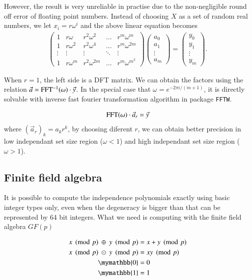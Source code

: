 \documentclass{article}
\newcommand{\<}{\langle}
\renewcommand{\>}{\rangle}
\theoremstyle{definition}\newtheorem{definition}{\textit{Definition}}
\begin{document}
However, the result is very unreliable in practise due to the non-negligible round off error of floating point numbers.
Instead of choosing $X$ as a set of random real numbers, we let $x_i = r\omega^i$ and the above linear equation becomes
\begin{align}
\left(\begin{matrix}
1 & r\omega & r^2\omega^2 & \ldots & r^m\omega^m \\
1 & r\omega^2 & r^2\omega^4 & \ldots & r^m\omega^{2m} \\
\vdots & \vdots & \vdots &\ddots & \vdots \\
1 & r\omega^m & r^2\omega^{2m} & \ldots & r^m\omega^{m^2}
\end{matrix}\right)
\left(\begin{matrix}
a_0 \\ a_1 \\ \vdots \\ a_m
\end{matrix}\right)
= \left(\begin{matrix}
y_0 \\ y_1 \\ \vdots \\ y_m
\end{matrix}\right).
\end{align}

When $r=1$, the left side is a DFT matrix. We can obtain the factors using the relation $\vec a = {\rm FFT^{-1}}(\omega) \cdot \vec y$.
In the special case that $\omega = e^{-2\pi i/(m+1)}$, it is directly solvable with inverse fast fourier transformation algorithm in package \texttt{FFTW}.

\begin{equation}
{\rm FFT}(\omega) \cdot \vec a_r = \vec y
\end{equation}
where $(\vec a_r)_k = a_k r ^k$, by choosing diferent $r$, we can obtain better precision in low independant set size region  ($\omega<1$) and high independant set size region ($\omega>1$).

\subsection{Finite field algebra}
It is possible to compute the independence polynomials exactly using basic integer types only,
even when the degeneracy is bigger than that can be represented by 64 bit integers.
What we need is computing with the finite field algebra $GF(p)$

\begin{align}
\begin{split}
    x\pmod p ~\oplus~ y\pmod p &= x+y\pmod p\\
    x\pmod p ~\odot~ y\pmod p &= xy\pmod p\\
    \mymathbb{0} &= 0\\
    \mymathbb{1} &= 1
\end{split}
\end{align}
\end{document}
